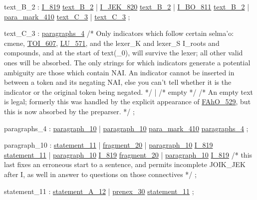 \label{html:y2}
text_B_2                :  \hyperref[html:y819]{I_819}  \hyperref[html:y2]{text_B_2}
                        |  \hyperref[html:y820]{I_JEK_820}  \hyperref[html:y2]{text_B_2}
                        |  \hyperref[html:y811]{I_BO_811}  \hyperref[html:y2]{text_B_2}
                        |  \hyperref[html:y410]{para_mark_410}  \hyperref[html:y3]{text_C_3}
                        |  \hyperref[html:y3]{text_C_3}
                        ;

\label{html:y3}
text_C_3                :  \hyperref[html:y4]{paragraphs_4}
   /* Only indicators which follow certain selma'o:
    cmene, \hyperref[html:y607]{TOI_607}, \hyperref[html:y571]{LU_571}, and the lexer_K and lexer_S I_roots and compounds,
    and at the start of text(_0), will survive the lexer; all other valid ones
    will be absorbed.  The only strings for which indicators generate a
    potential ambiguity are those which contain NAI.  An indicator cannot be
    inserted in between a token and its negating NAI, else you can't tell
    whether it is the indicator or the original token being negated. */
                        |  /* empty */
  /* An empty text is legal; formerly this was handled by the explicit
   appearance of \hyperref[html:y529]{FAhO_529}, but this is now absorbed by the preparser. */
                        ;

\label{html:y4}
paragraphs_4            :  \hyperref[html:y10]{paragraph_10}
                        |  \hyperref[html:y10]{paragraph_10}  \hyperref[html:y410]{para_mark_410}  \hyperref[html:y4]{paragraphs_4}
                        ;

\label{html:y10}
paragraph_10            :  \hyperref[html:y11]{statement_11}
                        |  \hyperref[html:y20]{fragment_20}
                        |  \hyperref[html:y10]{paragraph_10}  \hyperref[html:y819]{I_819}  \hyperref[html:y11]{statement_11}
                        |  \hyperref[html:y10]{paragraph_10}  \hyperref[html:y819]{I_819}  \hyperref[html:y20]{fragment_20}
                        |  \hyperref[html:y10]{paragraph_10}  \hyperref[html:y819]{I_819}
                        /* this last fixes an erroneous start to a sentence,
                           and permits incomplete JOIK_JEK after I, as well
                           in answer to questions on those connectives  */
                        ;

\label{html:y11}
statement_11            :  \hyperref[html:y12]{statement_A_12}
                        |  \hyperref[html:y30]{prenex_30}  \hyperref[html:y11]{statement_11}
                        ;


